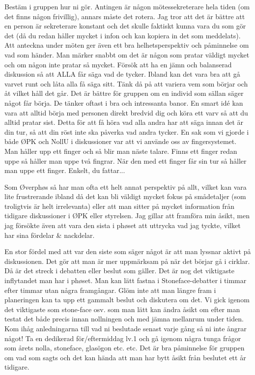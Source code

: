 \documentclass[10pt]{article}
\begin{document}
    Bestäm i gruppen hur ni gör. Antingen är någon mötessekreterare hela tiden (om det finns någon frivillig), annars måste det rotera. Jag tror att det är bättre att en person är sekreterare konstant och det skulle faktiskt kunna vara du som gör det (då du redan håller mycket i infon och kan kopiera in det som meddelats). Att anteckna under möten ger även ett bra helhetsperspektiv och påminnelse om vad som händer. Man märker snabbt om det är någon som pratar väldigt mycket och om någon inte pratar så mycket. Försök att ha en jämn och balanserad diskussion så att ALLA får säga vad de tycker. Ibland kan det vara bra att gå varvet runt och låta alla få säga sitt. Tänk då på att variera vem som börjar och åt vilket håll det går. Det är bättre för gruppen om en individ som sällan säger något får börja. De tänker oftast i bra och intressanta banor. En smart idé kan vara att alltid börja med personen direkt bredvid dig och köra ett varv så att du alltid pratar sist. Detta för att få höra vad alla andra har att säga innan det är din tur, så att din röst inte ska påverka vad andra tycker. En sak som vi gjorde i både ØPK och NollU i diskussioner var att vi använde oss av fingersystemet. Man håller upp ett finger och så blir man näste talare. Finns ett finger redan uppe så håller man uppe två fingrar. När den med ett finger får sin tur så håller man uppe ett finger. Enkelt, du fattar...

    Som Øverphøs så har man ofta ett helt annat perspektiv på allt, vilket kan vara lite frustrerande ibland då det kan bli väldigt mycket fokus på smådetaljer (som troligtvis är helt irrelevanta) eller att man sitter på mycket information från tidigare diskussioner i ØPK eller styrelsen. Jag gillar att framföra min åsikt, men jag försökte även att vara den sista i phøset att uttrycka vad jag tyckte, vilket har sina fördelar \& nackdelar.

    En stor fördel med att var den siste som säger något är att man lyssnar aktivt på diskussionen. Det gör att man är mer uppmärksam på när det börjar gå i cirklar. Då är det streck i debatten eller beslut som gäller. Det är nog det viktigaste inflytandet man har i phøset. Man kan lätt fastna i Stoneface-debatter i timmar efter timmar utan några framgångar. Glöm inte att man längre fram i planeringen kan ta upp ett gammalt beslut och diskutera om det. Vi gick igenom det viktigaste som stone-face osv. som man lätt kan ändra åsikt om efter man testat det både precis innan nollningen och med jämna mellanrum under tiden. Kom ihåg anledningarna till vad ni beslutade senast varje gång så ni inte ångrar något! Ta en dedikerad för/eftermiddag lv.1 och gå igenom några tunga frågor som årets nolla, stoneface, glasögon etc. etc. Det är bra påminnelse för gruppen om vad som sagts och det kan hända att man har bytt åsikt från beslutet ett år tidigare.
\end{document}
